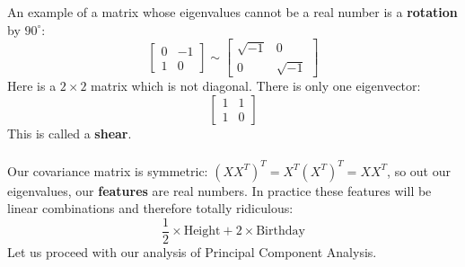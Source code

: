\documentclass[12pt]{article}
\begin{document}
\noindent An example of a matrix whose eigenvalues cannot be a real number is a \textbf{rotation} by $90^\circ$: 
$$ \left[ \begin{array}{cr} 0 & -1 \\ 1 & 0 \end{array}\right] 
\sim \left[ \begin{array}{cr} \sqrt{-1} & 0 \\ 0 & \sqrt{-1} \end{array}\right] $$
Here is a $2 \times 2$ matrix which is not diagonal.  There is only one eigenvector:
$$ \left[ \begin{array}{cr} 1 & 1 \\ 1 & 0 \end{array}\right] $$
This is called a \textbf{shear}.  \\ \\
Our covariance matrix is symmetric: $(X X^T)^T = X^T (X^T)^T = X X^T$, so out our eigenvalues, our {\color{green!20!blue} \textbf{features}} are real numbers.  In practice these features will be linear combinations and therefore totally ridiculous:
$$ \frac{1}{2} \times \text{Height} + 2 \times \text{Birthday} $$
Let us proceed with our analysis of Principal Component Analysis.
\end{document}
